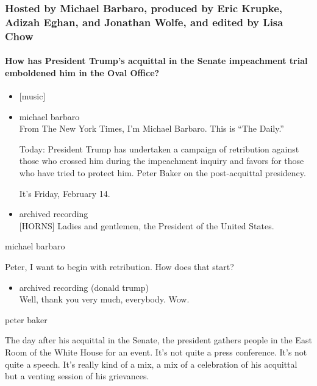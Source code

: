 \hypertarget{hosted-by-michael-barbaro-produced-by-eric-krupke-adizah-eghan-and-jonathan-wolfe-and-edited-by-lisa-chow}{%
\subsubsection{Hosted by Michael Barbaro, produced by Eric Krupke,
Adizah Eghan, and Jonathan Wolfe, and edited by Lisa
Chow}\label{hosted-by-michael-barbaro-produced-by-eric-krupke-adizah-eghan-and-jonathan-wolfe-and-edited-by-lisa-chow}}

\hypertarget{how-has-president-trumps-acquittal-in-the-senate-impeachment-trial-emboldened-him-in-the-oval-office}{%
\paragraph{How has President Trump's acquittal in the Senate impeachment
trial emboldened him in the Oval
Office?}\label{how-has-president-trumps-acquittal-in-the-senate-impeachment-trial-emboldened-him-in-the-oval-office}}

\begin{itemize}
\item
  {[}music{]}
\item
  michael barbaro\\
  From The New York Times, I'm Michael Barbaro. This is ``The Daily.''

  Today: President Trump has undertaken a campaign of retribution
  against those who crossed him during the impeachment inquiry and
  favors for those who have tried to protect him. Peter Baker on the
  post-acquittal presidency.

  It's Friday, February 14.
\item
  archived recording\\
  {[}HORNS{]} Ladies and gentlemen, the President of the United States.
\end{itemize}

michael barbaro

Peter, I want to begin with retribution. How does that start?

\begin{itemize}
\tightlist
\item
  archived recording (donald trump)\\
  Well, thank you very much, everybody. Wow.
\end{itemize}

peter baker

The day after his acquittal in the Senate, the president gathers people
in the East Room of the White House for an event. It's not quite a press
conference. It's not quite a speech. It's really kind of a mix, a mix of
a celebration of his acquittal but a venting session of his grievances.

